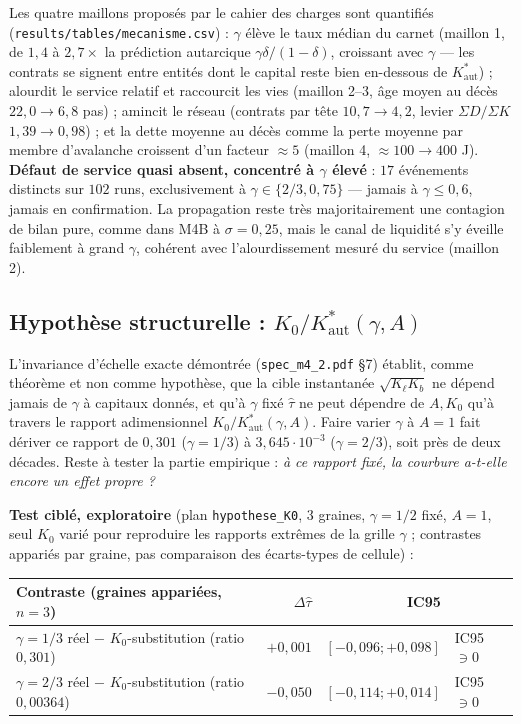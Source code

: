\documentclass[11pt,a4paper]{article}
\newcommand{\code}[1]{\texttt{#1}}
\newcommand{\Kaut}{K^{*}_{\mathrm{aut}}}
\begin{document}
Les quatre maillons proposés par le cahier des charges sont quantifiés
(\code{results/tables/mecanisme.csv}) : $\gamma$ élève le taux médian du
carnet (maillon 1, de $1{,}4$ à $2{,}7\times$ la prédiction autarcique
$\gamma\delta/(1-\delta)$, croissant avec $\gamma$ --- les contrats se
signent entre entités dont le capital reste bien en-dessous de $\Kaut$) ;
alourdit le service relatif et raccourcit les vies (maillon 2--3, âge
moyen au décès $22{,}0\to6{,}8$ pas) ; amincit le réseau (contrats par
tête $10{,}7\to4{,}2$, levier $\Sigma D/\Sigma K$ $1{,}39\to0{,}98$) ; et
la dette moyenne au décès comme la perte moyenne par membre d'avalanche
croissent d'un facteur $\approx5$ (maillon 4, $\approx100\to400$ J).
\textbf{Défaut de service quasi absent, concentré à $\gamma$ élevé} :
$17$ événements distincts sur $102$ runs, exclusivement à
$\gamma\in\{2/3,0{,}75\}$ --- jamais à $\gamma\le0{,}6$, jamais en
confirmation. La propagation reste très majoritairement une contagion de
bilan pure, comme dans M4B à $\sigma=0{,}25$, mais le canal de liquidité
s'y éveille faiblement à grand $\gamma$, cohérent avec l'alourdissement
mesuré du service (maillon 2).

\subsection{Hypothèse structurelle : $K_0/\Kaut(\gamma,A)$}

L'invariance d'échelle exacte démontrée (\code{spec\_m4\_2.pdf} §7)
établit, comme théorème et non comme hypothèse, que la cible instantanée
$\sqrt{K_\ell K_b}$ ne dépend jamais de $\gamma$ à capitaux donnés, et
qu'à $\gamma$ fixé $\hat\tau$ ne peut dépendre de $A,K_0$ qu'à travers le
rapport adimensionnel $K_0/\Kaut(\gamma,A)$. Faire varier $\gamma$ à
$A=1$ fait dériver ce rapport de $0{,}301$ ($\gamma=1/3$) à
$3{,}645\cdot10^{-3}$ ($\gamma=2/3$), soit près de deux décades. Reste à
tester la partie empirique : \emph{à ce rapport fixé, la courbure a-t-elle
encore un effet propre ?}

\textbf{Test ciblé, exploratoire} (plan \code{hypothese\_K0}, 3 graines,
$\gamma=1/2$ fixé, $A=1$, seul $K_0$ varié pour reproduire les rapports
extrêmes de la grille $\gamma$ ; contrastes appariés par graine, pas
comparaison des écarts-types de cellule) :
\begin{center}
\begin{tabular}{lrrl}
\toprule
Contraste (graines appariées, $n=3$) & $\Delta\hat\tau$ & IC95 & \\
\midrule
$\gamma=1/3$ réel $-$ $K_0$-substitution (ratio $0{,}301$) & $+0{,}001$ & $[-0{,}096;+0{,}098]$ & IC95 $\ni0$\\
$\gamma=2/3$ réel $-$ $K_0$-substitution (ratio $0{,}00364$) & $-0{,}050$ & $[-0{,}114;+0{,}014]$ & IC95 $\ni0$\\
\bottomrule
\end{tabular}
\end{center}
\end{document}
